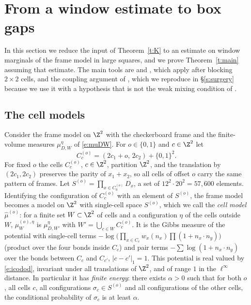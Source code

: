 \section{From a window estimate to box gaps}\label{s:mixing}

In this section we reduce the input of Theorem~\ref{t:K} to an estimate on window marginals of the frame model in large squares, and we prove Theorem~\ref{t:main} assuming that estimate. The main tools are \cite[Theorem~2.1]{MOS94} and \cite[Theorem~4.1]{MO94}, which apply after blocking $2 \times 2$ cells, and the coupling argument of \cite[Proposition~2.1]{MOS94}, which we reproduce in \S\ref{s:surgery} because we use it with a hypothesis that is not the weak mixing condition of \cite{MOS94}.

\subsection{The cell models}\label{s:cells}

Consider the frame model on $\Z^2$ with the checkerboard frame and the finite-volume measures $\mu^\eta_{D, W}$ of \eqref{e:muDW}. For $o \in \{0, 1\}$ and $c \in \Z^2$ let
\begin{equation*}
C^{(o)}_c = (2 c_1 + o, \, 2 c_2) + \{0, 1\}^2 .
\end{equation*}
For fixed $o$ the cells $C^{(o)}_c$, $c \in \Z^2$, partition $\Z^2$, and the translation by $(2c_1, 2c_2)$ preserves the parity of $x_1 + x_2$, so all cells of offset $o$ carry the same pattern of frames. Let $S^{(o)} = \prod_{x \in C^{(o)}_0} D_x$, a set of $12^2 \cdot 20^2 = 57{, }600$ elements. Identifying the configuration of $C^{(o)}_c$ with an element of $S^{(o)}$, the frame model becomes a model on $\Z^2$ with single-cell space $S^{(o)}$, which we call the \emph{cell model} $\hat\mu^{(o)}$: for a finite set $W \subset \Z^2$ of cells and a configuration $\eta$ of the cells outside $W$, $\hat\mu^{(o), \eta}_W$ is $\mu^\eta_{D, W'}$ with $W' = \bigcup_{c \in W} C^{(o)}_c$. It is the Gibbs measure of the potential with single-cell terms $-\log \bigl( \prod_{x \in C_c} w_x(n_x) \prod (1 + n_x \cdot n_y) \bigr)$ (product over the four bonds inside $C_c$) and pair terms $-\sum \log (1 + n_x \cdot n_y)$ over the bonds between $C_c$ and $C_{c'}$, $|c - c'|_1 = 1$. This potential is real valued by \eqref{e:icodod}, invariant under all translations of $\Z^2$, and of range $1$ in the $\ell^\infty$ distance. In particular it has \emph{finite energy}: there exists $\alpha > 0$ such that for both $o$, all cells $c$, all configurations $\sigma_c \in S^{(o)}$ and all configurations of the other cells, the conditional probability of $\sigma_c$ is at least $\alpha$.

